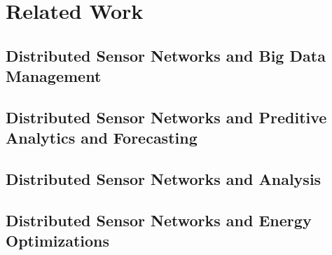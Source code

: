 \chapter{Related Work}

\section{Distributed Sensor Networks and Big Data Management}

\section{Distributed Sensor Networks and Preditive Analytics and Forecasting}

\section{Distributed Sensor Networks and Analysis}

\section{Distributed Sensor Networks and Energy Optimizations}



